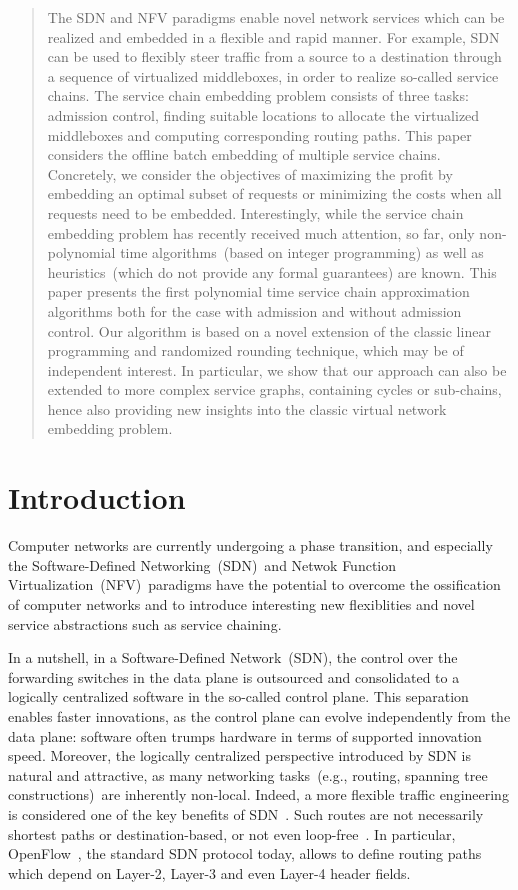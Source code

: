 \documentclass[10pt, conference, letterpaper]{IEEEtran}
\begin{document}
\begin{abstract}
The SDN and NFV paradigms enable novel 
network services which can be realized and embedded in a flexible
and rapid manner.
For example, SDN can be used to flexibly steer traffic
from a source to a destination through a sequence of virtualized middleboxes, 
in order to realize so-called service chains. 
The service chain embedding problem consists of
three tasks: admission control, finding suitable locations to allocate the virtualized
middleboxes and computing corresponding routing paths.
This paper considers the offline batch embedding of multiple service chains. Concretely, we consider the objectives of maximizing the profit by embedding an optimal subset of requests or minimizing the costs when all requests need to be embedded. 
Interestingly, while the service chain embedding problem
has recently received much attention, so far, only
non-polynomial time algorithms~(based on integer programming)
as well as heuristics~(which do not provide any formal guarantees)
are known. 
This paper presents the first polynomial time service chain
 approximation algorithms both for the case with admission and without admission control.
Our algorithm is based on a novel extension of the classic linear programming and randomized rounding 
technique, which may be of independent interest. 
In particular, we show that our approach can also be extended to more complex service graphs, containing cycles or sub-chains, hence also
  providing new insights into the classic virtual
  network embedding problem.
\end{abstract}

 
\section{Introduction}

Computer networks are currently undergoing a phase transition, and
especially the Software-Defined Networking~(SDN)~and
Netwok Function Virtualization~(NFV)~paradigms 
have the potential to overcome the ossification of computer
networks and to introduce interesting new flexiblities
and novel service abstractions such as service chaining.

In a nutshell, in a Software-Defined Network~(SDN), the control over the forwarding
switches in the data plane
is outsourced and consolidated to a logically centralized software in the so-called
control plane. This separation enables faster innovations, as the control plane
can evolve independently from the data plane: software often trumps hardware in terms 
of supported innovation speed.
Moreover, the logically centralized perspective introduced by SDN is natural and attractive, as
many networking tasks~(e.g., routing, spanning tree constructions)~are inherently non-local.
Indeed, a more flexible traffic engineering is considered one of the key benefits
of SDN~\cite{b4,sdx}.
Such routes are not necessarily shortest paths or destination-based,
or
not even loop-free~\cite{flowtags}.
 In particular,  
OpenFlow~\cite{OpenFlow}, the standard SDN protocol today, allows to define routing paths 
which depend on Layer-2, Layer-3 and even Layer-4 header fields. 
\end{document}
